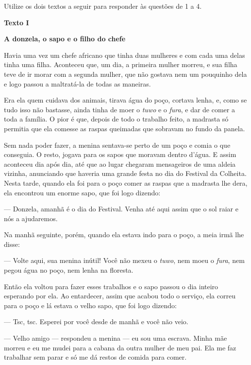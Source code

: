 Utilize os dois textos a seguir para responder às questões de 1 a 4.

\begin{myquote}
\begin{center}
\textbf{Texto I}

\textbf{A donzela, o sapo e o filho do chefe}
\end{center}
\medskip

\noindent Havia uma vez um chefe africano que tinha duas mulheres e com cada uma
delas tinha uma filha. Aconteceu que, um dia, a primeira mulher morreu,
e sua filha teve de ir morar com a segunda mulher, que não gostava nem
um pouquinho dela e logo passou a maltratá-la de todas as maneiras.

Era ela quem cuidava dos animais, tirava água do poço, cortava lenha, e,
como se tudo isso não bastasse, ainda tinha de moer o
\emph{tuwo} e o \emph{fura}, e dar de comer a
toda a família. O pior é que, depois de todo o trabalho feito, a
madrasta só permitia que ela comesse as raspas queimadas que sobravam no
fundo da panela.

Sem nada poder fazer, a menina sentava-se perto de um poço e comia o que
conseguia. O resto, jogava para os sapos que moravam dentro d'água. E
assim aconteceu dia após dia, até que ao lugar chegaram mensageiros de
uma aldeia vizinha, anunciando que haveria uma grande festa no dia do
Festival da Colheita. Nesta tarde, quando ela foi para o poço comer as
raspas que a madrasta lhe dera, ela encontrou um enorme sapo, que foi
logo dizendo:

— Donzela, amanhã é o dia do Festival. Venha até aqui assim que o sol
raiar e nós a ajudaremos.

Na manhã seguinte, porém, quando ela estava indo para o poço, a meia
irmã lhe disse:

— Volte aqui, sua menina inútil! Você não mexeu o \emph{tuwo}, nem moeu
o \emph{fura}, nem pegou água no poço, nem lenha na floresta.

Então ela voltou para fazer esses trabalhos e o sapo passou o dia
inteiro esperando por ela. Ao entardecer, assim que acabou todo o
serviço, ela correu para o poço e lá estava o velho sapo, que foi logo
dizendo:

— Tsc, tsc. Esperei por você desde de manhã e você não veio.

— Velho amigo — respondeu a menina — eu sou uma escrava. Minha mãe
morreu e eu me mudei para a cabana da outra mulher de meu pai. Ela me
faz trabalhar sem parar e só me dá restos de comida para comer.


\end{myquote}
